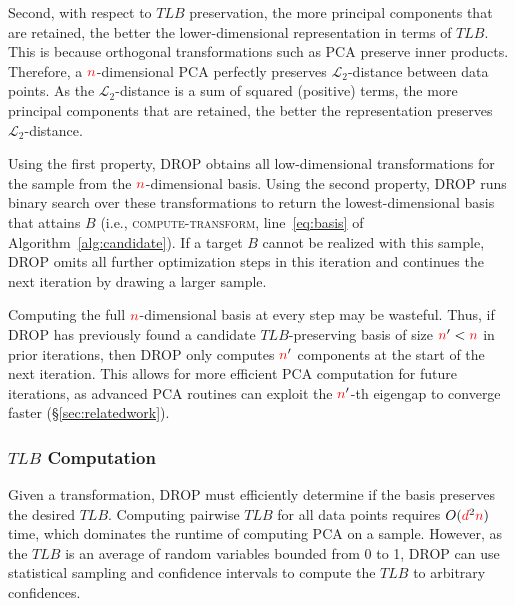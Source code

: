Second, with respect to $TLB$ preservation, the more principal components that are retained, the better the lower-dimensional representation in terms of $TLB$.  
This is because orthogonal transformations such as PCA preserve inner products. 
Therefore, a ${\color{red}n}$-dimensional PCA perfectly preserves $\mathcal{L}_2$-distance between data points. 
As the $\mathcal{L}_2$-distance is a sum of squared (positive) terms, the more principal components that are retained, the better the representation preserves $\mathcal{L}_2$-distance.

Using the first property, DROP obtains all low-dimensional transformations for the sample from the ${\color{red}n}$-dimensional basis.  
Using the second property, DROP runs binary search over these transformations to return the lowest-dimensional basis that attains $B$ (i.e., \textsc{compute-transform}, line~\ref{eq:basis} of Algorithm~\ref{alg:candidate}).
If a target $B$ cannot be realized with this sample, DROP omits all further optimization steps in this iteration and continues the next iteration by drawing a larger sample.

Computing the full ${\color{red}n}$-dimensional basis at every step may be wasteful. 
Thus, if DROP has previously found a candidate $TLB$-preserving basis of size ${\color{red}n}' < {\color{red}n}$ in prior iterations, then DROP only computes ${\color{red}n}'$ components at the start of the next iteration.
This allows for more efficient PCA computation for future iterations, as advanced PCA routines can exploit the ${\color{red}n}'$-th eigengap to converge faster (\S\ref{sec:relatedwork}).



\subsubsection{$TLB$ Computation}

Given a transformation, DROP must efficiently determine if the basis preserves the desired $TLB$.
Computing pairwise $TLB$ for all data points requires $O({\color{red}d}^2{\color{red}n})$ time, which dominates the runtime of computing PCA on a sample.
However, as the $TLB$ is an average of random variables bounded from 0 to 1, DROP can use statistical sampling and confidence intervals to compute the $TLB$ to arbitrary confidences.

